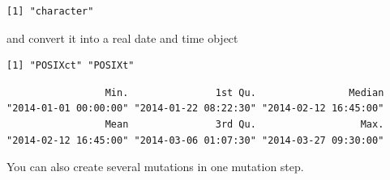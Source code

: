 \documentclass[
  letterpaper,
]{book}
\newenvironment{Shaded}{\begin{snugshade}}{\end{snugshade}}
\newcommand{\AttributeTok}[1]{\textcolor[rgb]{0.40,0.45,0.13}{#1}}
\newcommand{\ConstantTok}[1]{\textcolor[rgb]{0.56,0.35,0.01}{#1}}
\newcommand{\FunctionTok}[1]{\textcolor[rgb]{0.28,0.35,0.67}{#1}}
\newcommand{\NormalTok}[1]{\textcolor[rgb]{0.00,0.23,0.31}{#1}}
\newcommand{\OtherTok}[1]{\textcolor[rgb]{0.00,0.23,0.31}{#1}}
\newcommand{\SpecialCharTok}[1]{\textcolor[rgb]{0.37,0.37,0.37}{#1}}
\newcommand{\StringTok}[1]{\textcolor[rgb]{0.13,0.47,0.30}{#1}}
\begin{document}
\begin{Shaded}
\end{Shaded}

\begin{verbatim}
[1] "character"
\end{verbatim}

and convert it into a real date and time object

\begin{Shaded}
\end{Shaded}

\begin{verbatim}
[1] "POSIXct" "POSIXt" 
\end{verbatim}

\begin{Shaded}
\end{Shaded}

\begin{verbatim}
                 Min.               1st Qu.                Median 
"2014-01-01 00:00:00" "2014-01-22 08:22:30" "2014-02-12 16:45:00" 
                 Mean               3rd Qu.                  Max. 
"2014-02-12 16:45:00" "2014-03-06 01:07:30" "2014-03-27 09:30:00" 
\end{verbatim}

You can also create several mutations in one mutation step.

\begin{Shaded}
\end{Shaded}
\end{document}
